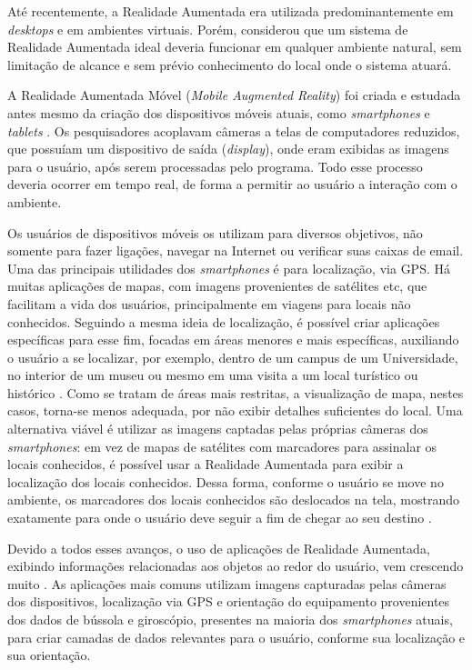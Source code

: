 Até recentemente, a Realidade Aumentada era utilizada predominantemente 
em \textit{desktops} e em ambientes virtuais. Porém, \cite{SurveyAR}
considerou que um sistema de Realidade Aumentada ideal deveria 
funcionar em qualquer ambiente natural, sem limitação de alcance e sem prévio
conhecimento do local onde o sistema atuará.

A Realidade Aumentada Móvel (\textit{Mobile Augmented Reality}) foi criada e estudada
antes mesmo da criação dos dispositivos móveis atuais, como \textit{smartphones} e 
\textit{tablets} \cite{ExperiencesWithHandheldAR, HouseOfOlbrich}. Os pesquisadores acoplavam câmeras a
telas de computadores reduzidos, que possuíam um dispositivo de saída (\textit{display}),
onde eram exibidas as imagens para o usuário, após serem processadas pelo programa. 
Todo esse processo deveria ocorrer em tempo real, de forma a permitir ao usuário a interação
com o ambiente.



Os usuários de dispositivos móveis os utilizam para diversos objetivos, não somente para fazer
ligações, navegar na Internet ou verificar suas caixas de email. Uma das principais utilidades
dos \textit{smartphones} é para localização, via \gls{GPS}. Há muitas aplicações de mapas, 
com imagens provenientes 
de satélites etc, que facilitam a vida dos usuários, principalmente em viagens para locais não
conhecidos. Seguindo a mesma ideia de localização, é possível criar aplicações específicas para
esse fim, focadas em áreas menores e mais específicas, auxiliando o usuário a se localizar, por exemplo, dentro
de um campus de um Universidade, no interior de um museu \cite{ARMuseumGuide} ou mesmo em uma
visita a um local turístico ou histórico \cite{HouseOfOlbrich}. 
Como se tratam de áreas mais restritas, a visualização de mapa, nestes casos, torna-se
menos adequada, por não exibir detalhes suficientes do local. Uma alternativa viável é utilizar as 
imagens captadas pelas próprias câmeras dos \textit{smartphones}: em vez de mapas de satélites com marcadores
para assinalar os locais conhecidos, é possível usar a Realidade Aumentada para exibir a localização dos
locais conhecidos. Dessa forma, conforme o usuário se move no ambiente, os marcadores dos locais conhecidos são
deslocados na tela, mostrando exatamente para onde o usuário deve seguir a fim de chegar ao seu destino 
\cite{MOOAR, MOOAR_Study}.

Devido a todos esses avanços, o uso de aplicações de Realidade Aumentada, exibindo informações relacionadas aos objetos
ao redor do usuário, vem crescendo muito \cite{BooksOnAShelf}. As aplicações mais comuns utilizam imagens capturadas pelas câmeras
dos dispositivos, localização via \gls{GPS} e orientação do equipamento provenientes dos dados de bússola e giroscópio,
presentes na maioria
dos \textit{smartphones} atuais, para criar camadas de dados relevantes para o usuário, conforme sua localização e sua orientação.


